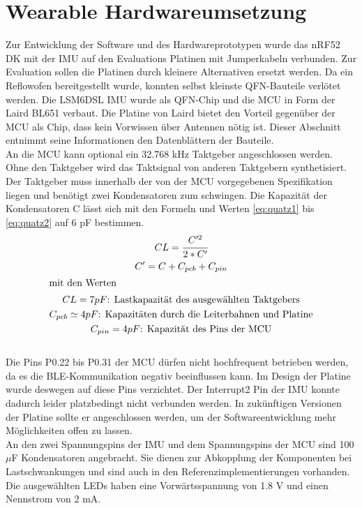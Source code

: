 \section{Wearable Hardwareumsetzung}
Zur Entwicklung der Software und des Hardwareprototypen wurde das nRF52 DK mit der IMU auf den Evaluations Platinen mit Jumperkabeln verbunden.
Zur Evaluation sollen die Platinen durch kleinere Alternativen ersetzt werden.
Da ein Reflowofen bereitgestellt wurde, konnten selbst kleinste QFN-Bauteile verlötet werden.
Die LSM6DSL IMU wurde als QFN-Chip und die MCU in Form der Laird BL651 verbaut.
Die Platine von Laird bietet den Vorteil gegenüber der MCU als Chip, dass kein Vorwissen über Antennen nötig ist.
Dieser Abschnitt entnimmt seine Informationen den Datenblättern der Bauteile.\\
An die MCU kann optional ein 32.768 kHz Taktgeber angeschlossen werden.
Ohne den Taktgeber wird das Taktsignal von anderen Taktgebern synthetisiert.
Der Taktgeber muss innerhalb der von der MCU vorgegebenen Spezifikation liegen und benötigt zwei Kondensatoren zum schwingen.
Die Kapazität der Kondensatoren C lässt sich mit den Formeln und Werten \ref{eq:quatz1} bis \ref{eq:quatz2} auf 6 pF bestimmen. \cite{datasheet_nrf52832}
\begin{gather}
  \label{eq:quatz1}
	CL = \cfrac{C'^2}{2*C'}\\
	C' = C + C_{pcb} + C_{pin}\\
\intertext{mit den Werten}
	CL = 7 pF\text{: Lastkapazität des ausgewählten Taktgebers}\\
	C_{pcb} \simeq 4 pF\text{: Kapazitäten durch die Leiterbahnen und Platine}\\
  \label{eq:quatz2}
	C_{pin} = 4 pF\text{: Kapazität des Pins der MCU}
\end{gather}\\
Die Pins P0.22 bis P0.31 der MCU dürfen nicht hochfrequent betrieben werden, da es die BLE-Kommunikation negativ beeinflussen kann. \cite{datasheet_nrf52832}
Im Design der Platine wurde deswegen auf diese Pins verzichtet.
Der Interrupt2 Pin der IMU konnte dadurch leider platzbedingt nicht verbunden werden.
In zukünftigen Versionen der Platine sollte er angeschlossen werden, um der Softwareentwicklung mehr Möglichkeiten offen zu lassen.\\
An den zwei Spannungspins der IMU und dem Spannungspins der MCU sind 100 $\mu$F Kondensatoren angebracht.
Sie dienen zur Abkopplung der Komponenten bei Lastschwankungen und sind auch in den Referenzimplementierungen vorhanden.
Die ausgewählten LEDs haben eine Vorwärtsspannung von 1.8 V und einen Nennstrom von 2 mA.
